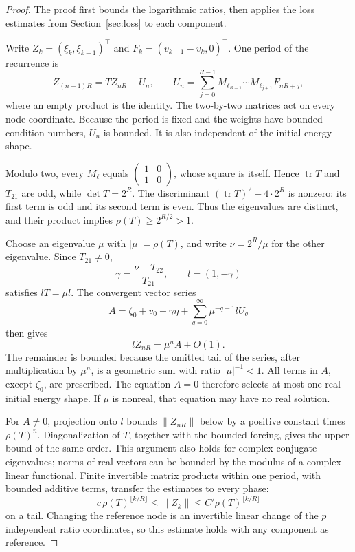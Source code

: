 \documentclass[11pt,a4paper]{article}
\numberwithin{equation}{section}
\begin{document}
\begin{proof}
The proof first bounds the logarithmic ratios, then applies the
loss estimates from Section~\ref{sec:loss} to each component.

Write \(Z_k=(\xi_k,\xi_{k-1})^\top\) and
\(F_k=(v_{k+1}-v_k,0)^\top\). One period of the recurrence is
\[
 Z_{(n+1)R}=TZ_{nR}+U_n,\qquad
 U_n=\sum_{j=0}^{R-1}
 M_{\ell_{R-1}}\cdots M_{\ell_{j+1}}F_{nR+j},
\]
where an empty product is the identity. The two-by-two matrices act
on every node coordinate. Because the period is fixed and the
weights have bounded condition numbers, \(U_n\) is bounded. It is
also independent of the initial energy shape.

Modulo two, every \(M_\ell\) equals
\(\left(\begin{smallmatrix}1&0\\1&0\end{smallmatrix}\right)\),
whose square is itself. Hence \(\operatorname{tr}T\) and \(T_{21}\)
are odd, while \(\det T=2^R\). The discriminant
\((\operatorname{tr}T)^2-4\cdot2^R\) is nonzero: its first term is
odd and its second term is even. Thus the eigenvalues are distinct,
and their product implies \(\rho(T)\ge2^{R/2}>1\).

Choose an eigenvalue \(\mu\) with \(|\mu|=\rho(T)\), and write
\(\nu=2^R/\mu\) for the other eigenvalue. Since \(T_{21}\ne0\),
\[
 \gamma=\frac{\nu-T_{22}}{T_{21}},\qquad l=(1,-\gamma)
\]
satisfies \(lT=\mu l\). The convergent vector series
\[
 A=\zeta_0+v_0-\gamma\eta
       +\sum_{q=0}^{\infty}\mu^{-q-1}lU_q
\]
then gives
\[
 lZ_{nR}=\mu^n A+O(1).
\]
The remainder is bounded because the omitted tail of the series,
after multiplication by \(\mu^n\), is a geometric sum with ratio
\(|\mu|^{-1}<1\). All terms in \(A\), except \(\zeta_0\), are
prescribed. The equation \(A=0\) therefore selects at most one
real initial energy shape. If \(\mu\) is nonreal, that equation
may have no real solution.

For \(A\ne0\), projection onto \(l\) bounds \(\|Z_{nR}\|\)
below by a positive constant times \(\rho(T)^n\).
Diagonalization of \(T\), together with the bounded forcing,
gives the upper bound of the same order. This argument also holds
for complex conjugate eigenvalues; norms of real vectors can be
bounded by the modulus of a complex linear functional.
Finite invertible matrix products within one period, with bounded
additive terms, transfer the estimates to every phase:
\[
 c\,\rho(T)^{\lfloor k/R\rfloor}
 \le\|Z_k\|\le C'\rho(T)^{\lfloor k/R\rfloor}
\]
on a tail. Changing the reference node is an invertible linear
change of the \(p\) independent ratio coordinates, so this estimate
holds with any component as reference.


\end{proof}
\end{document}

